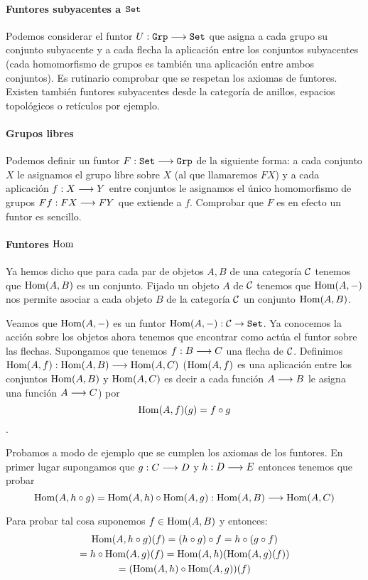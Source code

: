 \paragraph{Funtores subyacentes a $\texttt{Set}$}
Podemos considerar el funtor $U : \texttt{Grp}\longrightarrow \texttt{Set}$
que asigna a cada grupo su conjunto subyacente y a cada flecha la
aplicación entre los conjuntos subyacentes (cada homomorfismo de
grupos es también una aplicación entre ambos conjuntos). Es rutinario
comprobar que se respetan los axiomas de funtores. Existen también
funtores subyacentes desde la categoría de anillos, espacios topológicos
o retículos por ejemplo.

\paragraph{Grupos libres}
Podemos definir un funtor $F : \texttt{Set}\longrightarrow \texttt{Grp}$ de la siguiente
forma: a cada conjunto $X$ le asignamos el grupo libre sobre $X$
(al que llamaremos $F X$) y a
cada aplicación $f : X\longrightarrow Y$ entre conjuntos le asignamos el
único homomorfismo de grupos $F f: F X\longrightarrow F Y$ que extiende a $f$.
Comprobar que
$F$ es en efecto un funtor es sencillo.

\paragraph{Funtores $\operatorname{Hom}$}
Ya hemos dicho que para cada par de objetos $A, B$ de
una categoría $\mathcal{C}$ tenemos que
$\operatorname{Hom}(A, B)$ es un conjunto. Fijado un objeto $A$ de
$\mathcal{C}$ tenemos que $\operatorname{Hom}(A, -)$ nos permite asociar a cada
objeto $B$ de la categoría $\mathcal{C}$ un conjunto $\operatorname{Hom}(A, B)$.

Veamos que $\operatorname{Hom}(A, -)$ es un funtor
$\operatorname{Hom}(A, -) : \mathcal{C} \rightarrow \texttt{Set}$. Ya conocemos la acción
sobre los objetos ahora tenemos que encontrar como actúa
el funtor sobre las flechas. Supongamos que tenemos
$f : B\longrightarrow C$ una flecha de $\mathcal{C}$. Definimos
$\operatorname{Hom}(A, f) : \operatorname{Hom}(A, B)\longrightarrow \operatorname{Hom}(A, C)$
($\operatorname{Hom}(A, f)$ es una aplicación entre los conjuntos
$\operatorname{Hom}(A, B)$ y $\operatorname{Hom}(A, C)$ es decir a cada función $A\longrightarrow B$
le asigna una función $A\longrightarrow C$) por
$$\operatorname{Hom}(A, f)(g) = f \circ g $$.

Probamos a modo de ejemplo
que se cumplen los axiomas de los funtores. En primer lugar
supongamos que $g : C\longrightarrow D$ y $h : D\longrightarrow E$ entonces tenemos
que probar
$$\operatorname{Hom}(A, h \circ g) = \operatorname{Hom}(A, h) \circ \operatorname{Hom}(A, g) :
\operatorname{Hom}(A, B)\longrightarrow \operatorname{Hom}(A, C)$$

Para probar tal cosa suponemos $f \in \operatorname{Hom}(A, B)$ y entonces:
\begin{multline*}
\operatorname{Hom}(A, h\circ g)(f) = (h \circ g) \circ f = h \circ (g \circ f) \\
= h \circ \operatorname{Hom}(A, g)(f) = \operatorname{Hom}(A, h)(\operatorname{Hom}(A, g)(f)) \\
= (\operatorname{Hom}(A, h) \circ \operatorname{Hom}(A, g))(f)
\end{multline*}


